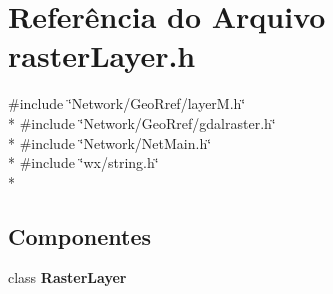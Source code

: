 \section{Referência do Arquivo raster\+Layer.\+h}
\label{raster_layer_8h}
{\ttfamily \#include \char`\"{}Network/\+Geo\+Rref/layer\+M.\+h\char`\"{}}\\*
{\ttfamily \#include \char`\"{}Network/\+Geo\+Rref/gdalraster.\+h\char`\"{}}\\*
{\ttfamily \#include \char`\"{}Network/\+Net\+Main.\+h\char`\"{}}\\*
{\ttfamily \#include \char`\"{}wx/string.\+h\char`\"{}}\\*
\subsection*{Componentes}
\begin{DoxyCompactItemize}
\item 
class {\bf Raster\+Layer}
\end{DoxyCompactItemize}
